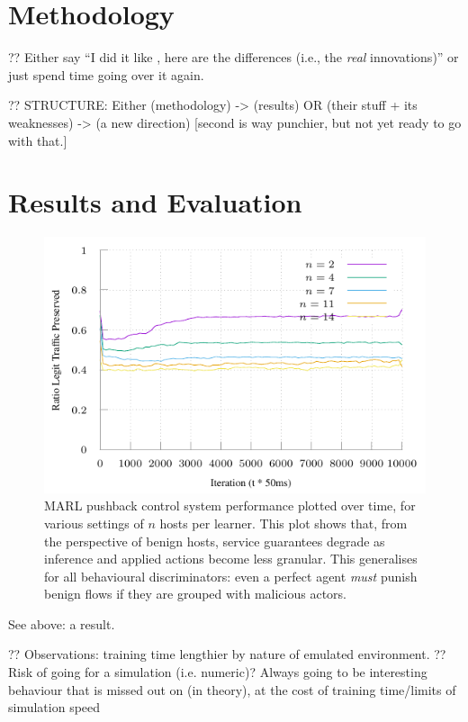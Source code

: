 \documentclass[conference, letterpaper, 10pt, times]{IEEEtran}
\begin{document}
\section{Methodology}

?? Either say ``I did it like \textcite{DBLP:journals/eaai/MalialisK15}, here are the differences (i.e., the \emph{real} innovations)'' or just spend time going over it again.

?? STRUCTURE: Either (methodology) -> (results) OR (their stuff + its weaknesses) -> (a new direction) [second is way punchier, but not yet ready to go with that.]

\section{Results and Evaluation}

\begin{figure}[ht]
	\includegraphics[width=\linewidth]{../plots/online-varyN-uneven}
	\caption{
		MARL pushback control system performance plotted over time, for various settings of $n$ hosts per learner.
		This plot shows that, from the perspective of benign hosts, service guarantees degrade as inference and applied actions become less granular.
		This generalises for all behavioural discriminators: even a perfect agent \emph{must} punish benign flows if they are grouped with malicious actors.
		\label{fig:marl-granularity}
	}
\end{figure}

See above: a result.

?? Observations: training time lengthier by nature of emulated environment.
?? Risk of going for a simulation (i.e. numeric)? Always going to be interesting behaviour that is missed out on (in theory), at the cost of training time/limits of simulation speed
\end{document}
